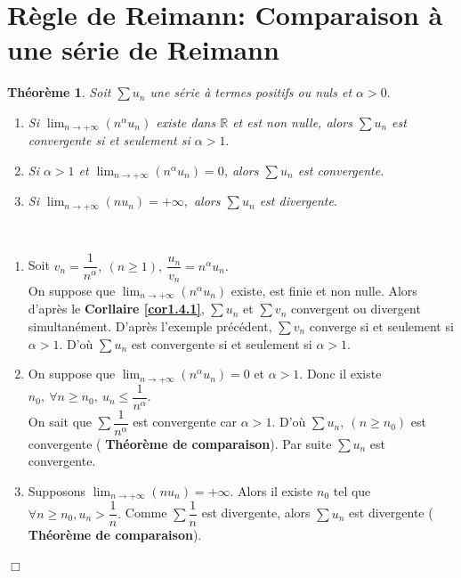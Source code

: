 \documentclass[11pt, a4paper]{book}
\newtheorem{teo}{Th\'eor\`eme}[section]
\newenvironment{pr}{\noindent {\bf Preuve} \noindent} {\hfill $\Box$\vskip 5mm}
\begin{document}
\section[R\`egle de Riemann]{R\`egle de Reimann: Comparaison \`a une s\'erie de Reimann}
\begin{teo} \label{teo2.3.3.1} Soit $\sum u_n$ une s\'erie \`a termes positifs ou nuls et $\alpha>0.$ \begin{enumerate}
\item Si  ${\displaystyle \lim_{n\rightarrow+\infty}(n^\alpha u_n)}$ existe dans $ \mathbb{R}$ et est non nulle, alors $\sum u_n$ est convergente si et seulement si $\alpha>1.$
\item Si $\alpha >1$ et ${\displaystyle \lim_{n\rightarrow+\infty}(n^\alpha u_n)=0}$, alors $\sum u_n$ est convergente.
\item Si ${\displaystyle \lim_{n\rightarrow+\infty}(n u_n)=+\infty},$ alors $\sum u_n$   est divergente. 
\end{enumerate} \end{teo}
\begin{pr}\\ \begin{enumerate}
\item Soit $v_n=\dfrac{1}{n^\alpha},~(n\geq 1),~\dfrac{u_n}{v_n}=n^\alpha u_n.$ \\ On suppose que ${\displaystyle \lim_{n\rightarrow+\infty}(n^\alpha u_n)}$ existe, est finie et non nulle. Alors d'apr\`es le \textbf{Corllaire \ref{cor1.4.1}}, $\sum u_n$ et $\sum v_n$ convergent ou divergent simultan\'ement. D'apr\`es l'exemple pr\'ec\'edent, $\sum v_n$ converge si et seulement si $\alpha>1.$ D'o\`u $\sum u_n$ est convergente si et seulement si $\alpha>1.$
\item On suppose que ${\displaystyle \lim_{n\rightarrow+\infty}(n^\alpha u_n)=0}$ et $\alpha>1.$ Donc il existe $n_0, ~\forall n\geq n_0,~u_n\leq \dfrac{1}{n^\alpha}.$\\ On sait que $\sum\dfrac{1}{n^\alpha}$ est convergente car $\alpha>1.$ D'o\`u $\sum u_n,~(n\geq n_0)$ est convergente ( \textbf{Th\'eor\`eme de comparaison}). Par suite $\sum u_n$ est convergente.
\item Supposons ${\displaystyle \lim_{n\rightarrow+\infty}(n u_n)=+\infty.}$ Alors il existe $n_0$ tel que $\forall n\geq n_0, u_n>\dfrac{1}{n}.$ Comme $\sum \dfrac{1}{n}$ est divergente, alors $\sum u_n$ est divergente ( \textbf{Th\'eor\`eme de comparaison}).
\end{enumerate}
\end{pr}
\end{document}
